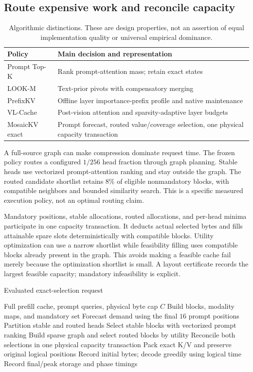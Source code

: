 \subsection{Route expensive work and reconcile capacity}
\begin{table}[t]
\caption{Algorithmic distinctions. These are design properties, not an
assertion of equal implementation quality or universal empirical dominance.}
\label{tab:design-differences}
\centering\small
\begin{tabularx}{\columnwidth}{lY}
\toprule
Policy & Main decision and representation\\\midrule
Prompt Top-K & Rank prompt-attention mass; retain exact states\\
LOOK-M & Text-prior pivots with compensatory merging\\
PrefixKV & Offline layer importance-prefix profile and native maintenance\\
VL-Cache & Post-vision attention and sparsity-adaptive layer budgets\\
MosaicKV exact & Prompt forecast, routed value/coverage selection, one physical capacity transaction\\
\bottomrule
\end{tabularx}
\end{table}
A full-source graph can make compression dominate request time. The frozen
policy routes a configured $1/256$ head fraction through graph planning.
Stable heads use vectorized prompt-attention ranking and stay outside the
graph. The routed candidate shortlist retains 8\% of eligible nonmandatory
blocks, with compatible neighbors and bounded similarity search. This is a
specific measured execution policy, not an optimal routing claim.

Mandatory positions, stable allocations, routed allocations, and per-head
minima participate in one capacity transaction. It deducts actual selected
bytes and fills attainable spare slots deterministically with compatible
blocks. Utility optimization can use a narrow shortlist while feasibility
filling uses compatible blocks already present in the graph. This avoids
making a feasible cache fail merely because the optimization shortlist is
small. A layout certificate records the largest feasible capacity; mandatory
infeasibility is explicit.

\begin{algorithm}[t]
\caption{Evaluated exact-selection request}
\label{alg:exact}
\begin{algorithmic}[1]
\REQUIRE Full prefill cache, prompt queries, physical byte cap $C$
\STATE Build blocks, modality maps, and mandatory set
\STATE Forecast demand using the final $16$ prompt positions
\STATE Partition stable and routed heads
\STATE Select stable blocks with vectorized prompt ranking
\STATE Build sparse graph and select routed blocks by utility
\STATE Reconcile both selections in one physical capacity transaction
\STATE Pack exact K/V and preserve original logical positions
\STATE Record initial bytes; decode greedily using logical time
\STATE Record final/peak storage and phase timings
\end{algorithmic}
\end{algorithm}

